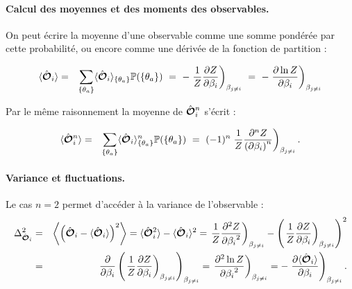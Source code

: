 \paragraph{Calcul des moyennes et des moments des observables.}
On peut écrire la moyenne d’une observable comme une somme pondérée par cette probabilité, ou encore comme une dérivée de la fonction de partition :

\begin{eqnarray}
	\langle \hat{\bm{\mathcal{O}}}_i \rangle &= & \sum_{\{ \theta_a\}} \langle\hat{\bm{\mathcal{O}}}_i\rangle_{\{\theta_a\}} \mathbb{P} ( \{ \theta_a \} ) ~=~- \left. \frac{1}{Z} \frac{\partial Z}{\partial \beta_i} \right )_{\beta_{j \neq i }} ~=~ - 	\left . \frac{\partial  \ln Z}{\partial \beta_i} \right )_{\beta_{j \neq i }}	
\end{eqnarray}

Par le même raisonnement la moyenne de $\hat{\bm{\mathcal{O}}}_i^n$ s'écrit :

\begin{eqnarray}
	\langle \hat{\bm{\mathcal{O}}}_i^n \rangle &= & \sum_{\{ \theta_a\}} \langle\hat{\bm{\mathcal{O}}}_i\rangle_{\{\theta_a\}}^n \mathbb{P} ( \{ \theta_a \} ) ~=~ (-1)^n \left. \frac{1}{Z} \frac{\partial^n Z}{{(\partial \beta_i)}^n} \right )_{\beta_{j \neq i }} .	
\end{eqnarray}

\paragraph{Variance et fluctuations.}
Le cas $n=2$ permet d’accéder à la variance de l’observable :
\begin{eqnarray}
	\Delta_{\hat{\bm{\mathcal{O}}}_i}^2 &=&  	\left \langle \left (\hat{\bm{\mathcal{O}}}_i - \langle\hat{\bm{\mathcal{O}}}_i \rangle \right )^2  \right \rangle  = 	\langle\hat{\bm{\mathcal{O}}}_i^2 \rangle  -  \langle\hat{\bm{\mathcal{O}}}_i \rangle^2 = \left . \frac{1}{Z} \frac{ \partial^2 Z }{ {\partial \beta_i}^2 }  \right )_{\beta_{j\neq i}} - \left ( \left . \frac{1}{Z}\frac{ \partial Z }{ \partial \beta_i }  \right )_{\beta_{j\neq i}}\right )^2  \\
		& = & \frac{\partial}{\partial \beta_i } \left ( \left . \frac{1}{Z} \frac{\partial Z}{\partial \beta_i }  \right )_{\beta_{j\neq i}}  \right )_{\beta_{j\neq i}} =  \left . \frac{\partial^2 \ln Z  }{{\partial \beta_i}^2 }  \right )_{\beta_{j\neq i}}  = - \left . 	\frac{\partial \langle\hat{\bm{\mathcal{O}}}_i \rangle }{\partial \beta_i } \right )_{\beta_{j\neq i}}	.	
\end{eqnarray}

